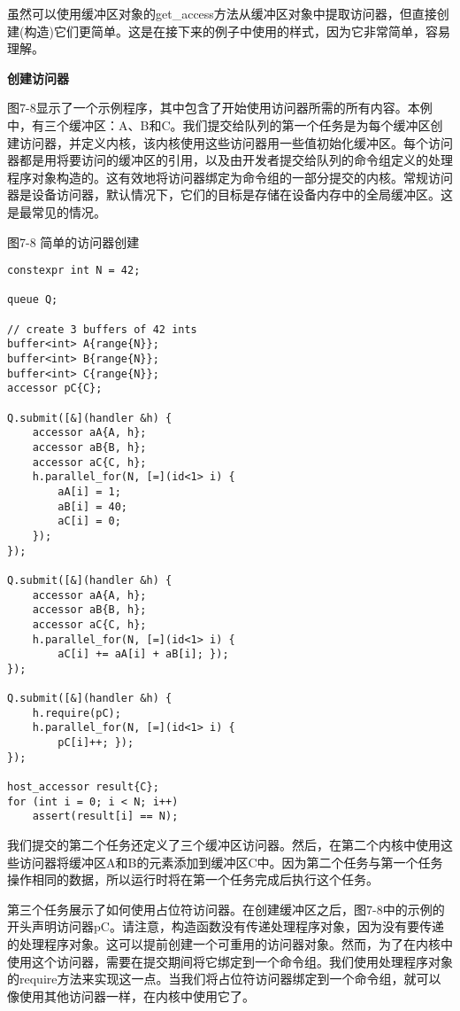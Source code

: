 虽然可以使用缓冲区对象的get\_access方法从缓冲区对象中提取访问器，但直接创建(构造)它们更简单。这是在接下来的例子中使用的样式，因为它非常简单，容易理解。\par

\hspace*{\fill} \par %
\textbf{创建访问器}

图7-8显示了一个示例程序，其中包含了开始使用访问器所需的所有内容。本例中，有三个缓冲区：A、B和C。我们提交给队列的第一个任务是为每个缓冲区创建访问器，并定义内核，该内核使用这些访问器用一些值初始化缓冲区。每个访问器都是用将要访问的缓冲区的引用，以及由开发者提交给队列的命令组定义的处理程序对象构造的。这有效地将访问器绑定为命令组的一部分提交的内核。常规访问器是设备访问器，默认情况下，它们的目标是存储在设备内存中的全局缓冲区。这是最常见的情况。\par

\hspace*{\fill} \par %
图7-8 简单的访问器创建
\begin{lstlisting}[caption={}]
constexpr int N = 42;

queue Q;

// create 3 buffers of 42 ints
buffer<int> A{range{N}};
buffer<int> B{range{N}};
buffer<int> C{range{N}};
accessor pC{C};

Q.submit([&](handler &h) {
	accessor aA{A, h};
	accessor aB{B, h};
	accessor aC{C, h};
	h.parallel_for(N, [=](id<1> i) {
		aA[i] = 1;
		aB[i] = 40;
		aC[i] = 0;
	});
});

Q.submit([&](handler &h) {
	accessor aA{A, h};
	accessor aB{B, h};
	accessor aC{C, h};
	h.parallel_for(N, [=](id<1> i) {
		aC[i] += aA[i] + aB[i]; });
});

Q.submit([&](handler &h) {
	h.require(pC);
	h.parallel_for(N, [=](id<1> i) {
		pC[i]++; });
});

host_accessor result{C};
for (int i = 0; i < N; i++)
	assert(result[i] == N);
\end{lstlisting}

我们提交的第二个任务还定义了三个缓冲区访问器。然后，在第二个内核中使用这些访问器将缓冲区A和B的元素添加到缓冲区C中。因为第二个任务与第一个任务操作相同的数据，所以运行时将在第一个任务完成后执行这个任务。\par

第三个任务展示了如何使用占位符访问器。在创建缓冲区之后，图7-8中的示例的开头声明访问器pC。请注意，构造函数没有传递处理程序对象，因为没有要传递的处理程序对象。这可以提前创建一个可重用的访问器对象。然而，为了在内核中使用这个访问器，需要在提交期间将它绑定到一个命令组。我们使用处理程序对象的require方法来实现这一点。当我们将占位符访问器绑定到一个命令组，就可以像使用其他访问器一样，在内核中使用它了。\par

